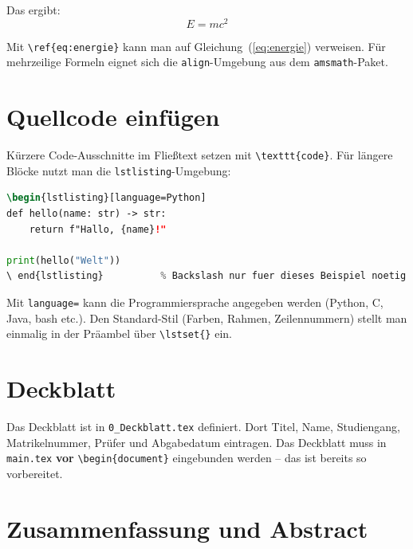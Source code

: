 Das ergibt:
\begin{equation}
    \label{eq:energie}
    E = mc^2
\end{equation}

Mit \texttt{\textbackslash ref\{eq:energie\}} kann man auf Gleichung~(\ref{eq:energie}) verweisen.
Für mehrzeilige Formeln eignet sich die \texttt{align}-Umgebung aus dem \texttt{amsmath}-Paket.

\section{Quellcode einfügen}
\label{sec:code}

Kürzere Code-Ausschnitte im Fließtext setzen mit \texttt{\textbackslash texttt\{code\}}.
Für längere Blöcke nutzt man die \texttt{lstlisting}-Umgebung:

\begin{lstlisting}[language=tex]
\begin{lstlisting}[language=Python]
def hello(name: str) -> str:
    return f"Hallo, {name}!"

print(hello("Welt"))
\ end{lstlisting}          % Backslash nur fuer dieses Beispiel noetig
\end{lstlisting}

Mit \texttt{language=} kann die Programmiersprache angegeben werden (Python, C, Java, bash etc.).
Den Standard-Stil (Farben, Rahmen, Zeilennummern) stellt man einmalig in der Präambel über \texttt{\textbackslash lstset\{\}} ein.

\section{Deckblatt}
\label{sec:deckblatt}

Das Deckblatt ist in \texttt{0\_Deckblatt.tex} definiert.
Dort Titel, Name, Studiengang, Matrikelnummer, Prüfer und Abgabedatum eintragen.
Das Deckblatt muss in \texttt{main.tex} \textbf{vor} \texttt{\textbackslash begin\{document\}} eingebunden werden – das ist bereits so vorbereitet.

\section{Zusammenfassung und Abstract}
\label{sec:zusammenfassung}

